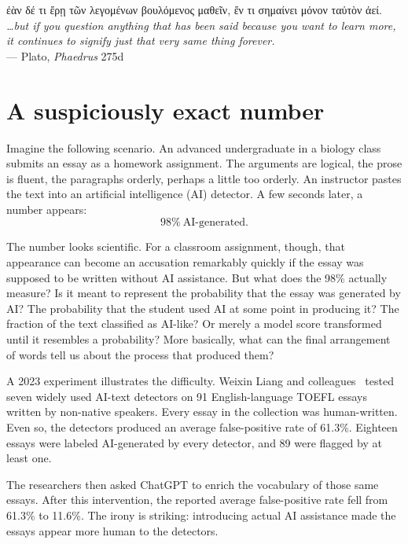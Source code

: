 \documentclass[pdflatex,sn-mathphys-num]{sn-jnl}
\begin{document}
\begin{flushright}
\begin{minipage}{0.78\textwidth}
\raggedleft
\foreignlanguage{greek}{ἐὰν δέ τι ἔρῃ τῶν λεγομένων βουλόμενος μαθεῖν, ἕν τι σημαίνει μόνον ταὐτὸν ἀεί.}\\[3pt]
\emph{\ldots but if you question anything that has been said because you want to learn more, it continues to signify just 
that very same thing forever.}\\[3pt]
--- Plato, \emph{Phaedrus} 275d~\cite{Plato1997}
\end{minipage}
\end{flushright}
\vspace{1.5ex}

\section*{A suspiciously exact number}
Imagine the following scenario. An advanced undergraduate in a biology class submits an essay as a homework assignment. The 
arguments are logical, the prose is fluent, the paragraphs orderly, perhaps a little too orderly. An instructor pastes the text into an 
artificial intelligence (AI) detector. A few seconds later, a number appears:
\[
98\%\ \text{AI-generated}.
\]

The number looks scientific. For a classroom assignment, though, that appearance can become an accusation remarkably quickly if the 
essay was supposed to be written without AI assistance. But what does the 98\% actually measure? Is it meant to represent the 
probability that the essay was generated by AI\@? The probability that the student used AI at some point in producing it? The fraction 
of the text classified as AI-like? Or merely a model score transformed until it resembles a probability? More basically, what can the final
 arrangement of words tell us about the process that produced them?

A 2023 experiment illustrates the difficulty. Weixin Liang and colleagues~\cite{Liang2023} tested seven widely used AI-text detectors on 
91 English-language TOEFL essays written by non-native speakers. Every essay in the collection was human-written. Even so, the 
detectors produced an average false-positive rate of 61.3\%. Eighteen essays were labeled AI-generated by every detector, and 89 were
 flagged by at least one.

The researchers then asked ChatGPT to enrich the vocabulary of those same essays. After this intervention, the reported average 
false-positive rate fell from 61.3\% to 11.6\%. The irony is striking: introducing actual AI assistance made the essays appear more human 
to the detectors.
\end{document}
